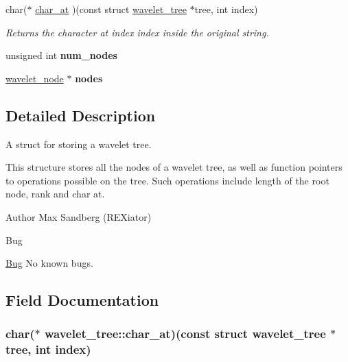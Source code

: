 \begin{DoxyCompactItemize}
char($\ast$ \hyperlink{structwavelet__tree_a96869ef02d34b2f00e2eeec474bd79f8}{char\-\_\-at} )(const struct \hyperlink{structwavelet__tree}{wavelet\-\_\-tree} $\ast$tree, int index)
\begin{DoxyCompactList}\small\item\em \-Returns the character at index {\ttfamily index} inside the original string. \end{DoxyCompactList}\item 
\hypertarget{structwavelet__tree_af6bed513f8bae6746dc5d9a587643d7a}{unsigned int {\bfseries num\-\_\-nodes}}\label{structwavelet__tree_af6bed513f8bae6746dc5d9a587643d7a}

\item 
\hypertarget{structwavelet__tree_af162c661f591e1f5083ef04d3fb8c46c}{\hyperlink{wavelet__tree_8h_structwavelet__node}{wavelet\-\_\-node} $\ast$ {\bfseries nodes}}\label{structwavelet__tree_af162c661f591e1f5083ef04d3fb8c46c}

\end{DoxyCompactItemize}


\subsection{\-Detailed \-Description}
\-A struct for storing a wavelet tree. 

\-This structure stores all the nodes of a wavelet tree, as well as function pointers to operations possible on the tree. \-Such operations include length of the root node, rank and char at.

\begin{DoxyAuthor}{\-Author}
\-Max \-Sandberg (\-R\-E\-Xiator) 
\end{DoxyAuthor}
\begin{DoxyRefDesc}{\-Bug}
\item[\hyperlink{bug__bug000154}{\-Bug}]\-No known bugs. \end{DoxyRefDesc}


\subsection{\-Field \-Documentation}
\hypertarget{structwavelet__tree_a96869ef02d34b2f00e2eeec474bd79f8}{
\subsubsection[{char\-\_\-at}]{\setlength{\rightskip}{0pt plus 5cm}char($\ast$ {\bf wavelet\-\_\-tree\-::char\-\_\-at})(const struct {\bf wavelet\-\_\-tree} $\ast$tree, int index)}}\label{structwavelet__tree_a96869ef02d34b2f00e2eeec474bd79f8}


